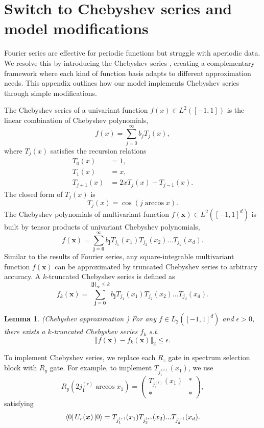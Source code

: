 \documentclass{article}
\theoremstyle{plain}
\newtheorem{lemma}[theorem]{Lemma}
\theoremstyle{definition}
\theoremstyle{remark}
\begin{document}
\section{Switch to Chebyshev series and model modifications}\label{apd3}
Fourier series are effective for periodic functions but struggle with aperiodic data. We resolve this by introducing the Chebyshev series \cite{mason2002}, creating a complementary framework where each kind of function basis adapts to different approximation needs. This appendix outlines how our model implements Chebyshev series through simple modifications.

The Chebyshev series of a univariant function $f(x)\in L^2([-1,1])$ is the linear combination of Chebyshev polynomials, 
$$
f(x) = \sum_{j=0}^{\infty} b_j T_j(x),
$$
where $T_j(x)$ satisfies the recursion relations 
\begin{align*}
    T_0(x) &= 1, \\
    T_1(x) &= x, \\
    T_{j+1}(x) &= 2xT_j(x)-T_{j-1}(x).
\end{align*}
The closed form of $T_j(x)$ is
$$
T_j(x) = \cos{(j\arccos{x})}.
$$
The Chebyshev polynomials of multivariant function $f(\boldsymbol{x})\in L^2([-1,1]^d)$ is built by tensor products of univariant Chebyshev polynomials,
$$
f(\boldsymbol{x}) = \sum_{\boldsymbol{j}=\boldsymbol{0}}^{\infty} b_{\boldsymbol{j}} T_{j_1}(x_1)T_{j_2}(x_2)...T_{j_d}(x_d).
$$
Similar to the results of Fourier series, any square-integrable multivariant function $f(\boldsymbol{x})$ can be approximated by truncated Chebyshev series to arbitrary accuracy. A $k$-truncated Chebyshev series is defined as
$$
f_k(\boldsymbol{x}) = \sum_{\boldsymbol{j}=\boldsymbol{0}}^{\Vert \boldsymbol{j}\Vert_{\infty}\leq k} b_{\boldsymbol{j}} T_{j_1}(x_1)T_{j_2}(x_2)...T_{j_d}(x_d).
$$
\begin{lemma}(Chebyshev approximation \cite{mason2002,canuto2006})
    For any $f\in L_2([-1,1]^d)$ and $\epsilon>0$, there exists a $k$-truncated Chebyshev series $f_k$ s.t.
    $$
    \Vert f(\boldsymbol{x})-f_k(\boldsymbol{x})\Vert_2 \leq \epsilon.
    $$
\end{lemma}

To implement Chebyshev series, we replace each $R_z$ gate in spectrum selection block with $R_y$ gate. For example, to implement $T_{j_1^{(r)}}(x_1)$, we use 
\begin{equation*}
    R_y(2j_1^{(r)}\arccos{x_1}) = 
    \begin{pmatrix}
        T_{j_1^{(r)}}(x_1) & * \\
        * & *
    \end{pmatrix},
\end{equation*}
satisfying
\begin{equation*}
    \bra{0}U_r(\boldsymbol{x})\ket{0} = T_{j^{(r)}_1}(x_1)T_{j^{(r)}_2}(x_2)...T_{j^{(r)}_d}(x_d).
\end{equation*}
\end{document}
